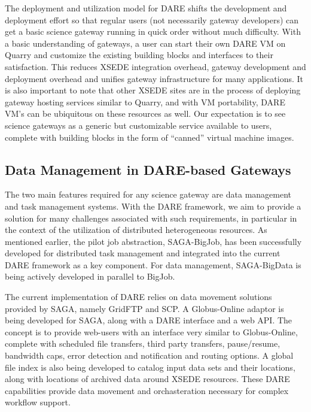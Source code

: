 \documentclass[]{svjour3}
\begin{document}
The deployment and utilization model for DARE shifts the development
and deployment effort so that regular users (not necessarily gateway
developers) can get a basic science gateway running in quick order
without much difficulty.  With a basic understanding of gateways, a
user can start their own DARE VM on Quarry and customize the existing
building blocks and interfaces to their satisfaction. This reduces
XSEDE integration overhead, gateway development and deployment
overhead and unifies gateway infrastructure for many applications. It
is also important to note that other XSEDE sites are in the process of
deploying gateway hosting services similar to Quarry, and with VM
portability, DARE VM's can be ubiquitous on these resources as
well. Our expectation is to see science gateways as a generic but
customizable service available to users, complete with building blocks
in the form of ``canned'' virtual machine images.


\subsection{Data Management in DARE-based Gateways}

The two main features required for any science gateway are data
management and task management systems.  With the DARE framework, we
aim to provide a solution for many challenges associated with such
requirements, in particular in the context of the utilization of
distributed heterogeneous resources.  As mentioned earlier, the pilot
job abstraction, SAGA-BigJob, has been successfully developed for
distributed task management and integrated into the current DARE
framework as a key component.  For data management, SAGA-BigData is
being actively developed in parallel to BigJob.

The current implementation of DARE relies on data movement solutions
provided by SAGA, namely GridFTP and SCP. A Globus-Online adaptor is
being developed for SAGA, along with a DARE interface and a web
API. The concept is to provide web-users with an interface very
similar to Globus-Online, complete with scheduled file transfers,
third party transfers, pause/resume, bandwidth caps, error detection
and notification and routing options. A global file index is also
being developed to catalog input data sets and their locations, along
with locations of archived data around XSEDE resources. These DARE
capabilities provide data movement and orchasteration necessary for
complex workflow support.
\end{document}
